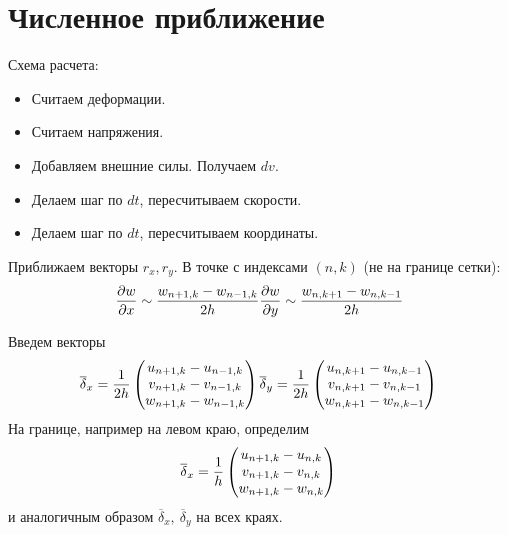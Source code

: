 \documentclass[12pt,a4paper,fleqn]{article}
\begin{document}
\clearpage

\section{Численное приближение}

Схема расчета:
\begin{itemize}
	\item Считаем деформации.
	\item Считаем напряжения.
	\item Добавляем внешние силы. Получаем $dv$.
	\item Делаем шаг по $dt$, пересчитываем скорости.
	\item Делаем шаг по $dt$, пересчитываем координаты.
\end{itemize}

Приближаем векторы $r_x, r_y$. В точке с индексами $(n, k)$ (не на границе сетки):
\begin{equation}
	\frac{\partial w}{\partial x} \sim \frac{w_{n+1,k} - w_{n-1, k}}{2h} \\
	\frac{\partial w}{\partial y} \sim \frac{w_{n,k+1} - w_{n, k-1}}{2h}
\end{equation}

Введем векторы 
\begin{equation}
	\overline{\delta}_x = \frac{1}{2h}
				\begin{pmatrix}
				u_{n+1, k} - u_{n-1,k} \\
				v_{n+1, k} - v_{n-1,k} \\
				w_{n+1, k} - w_{n-1,k} 
				\end{pmatrix} \\
	\overline{\delta}_y = \frac{1}{2h}
				\begin{pmatrix}
				u_{n, k+1} - u_{n,k-1} \\
				v_{n, k+1} - v_{n,k-1} \\
				w_{n, k+1} - w_{n,k-1} 
				\end{pmatrix} \\
\end{equation}
На границе, например на левом краю, определим 
\begin{equation}
	\overline{\delta}_x = \frac{1}{h}
				\begin{pmatrix}
				u_{n+1, k} - u_{n,k} \\
				v_{n+1, k} - v_{n,k} \\
				w_{n+1, k} - w_{n,k} 
				\end{pmatrix} \\
\end{equation}
и аналогичным образом $\overline{\delta}_x,\ \overline{\delta}_y$ на всех краях.
\end{document}
